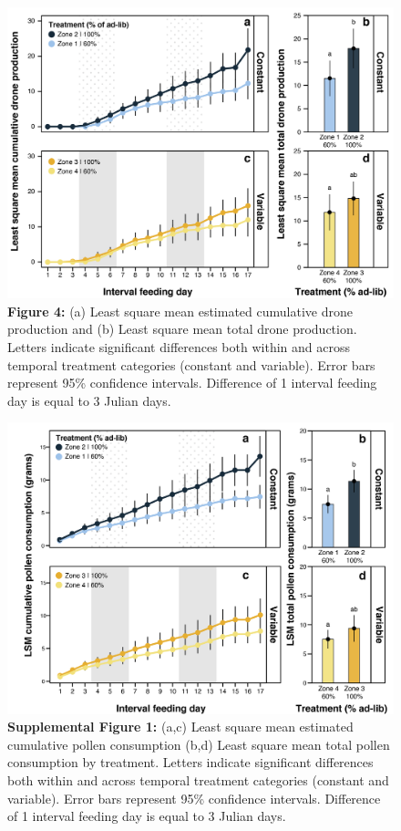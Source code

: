\documentclass[11pt,]{article}
\begin{document}
\begin{figure}
\centering
\includegraphics{./fig4_drones.png}
\caption{\textbf{Figure 4:} (a) Least square mean estimated cumulative
drone production and (b) Least square mean total drone production.
Letters indicate significant differences both within and across temporal
treatment categories (constant and variable). Error bars represent 95\%
confidence intervals. Difference of 1 interval feeding day is equal to 3
Julian days.}
\end{figure}

\begin{figure}
\centering
\includegraphics{./supfig1_pollen.png}
\caption{\textbf{Supplemental Figure 1:} (a,c) Least square mean
estimated cumulative pollen consumption (b,d) Least square mean total
pollen consumption by treatment. Letters indicate significant
differences both within and across temporal treatment categories
(constant and variable). Error bars represent 95\% confidence intervals.
Difference of 1 interval feeding day is equal to 3 Julian days.}
\end{figure}
\end{document}
